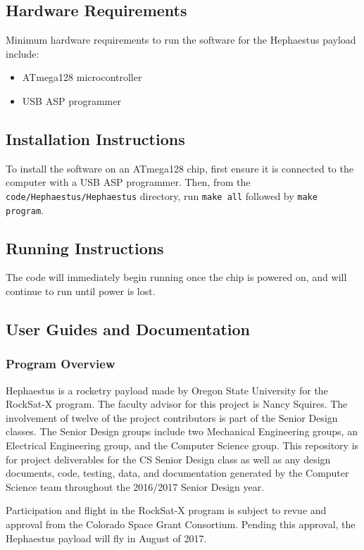 \subsection{Hardware Requirements}
Minimum hardware requirements to run the software for the Hephaestus payload include:
\begin{itemize}
	\item{ATmega128 microcontroller}
	\item{USB ASP programmer}
\end{itemize}

\subsection{Installation Instructions}
To install the software on an ATmega128 chip, first ensure it is connected to
the computer with a USB ASP programmer. Then, from the 
\texttt{code/Hephaestus/Hephaestus} directory, run \texttt{make all}
followed by \texttt{make program}.

\subsection{Running Instructions}
The code will immediately begin running once the chip is powered on, and will
continue to run until power is lost.

\subsection{User Guides and Documentation}
\subsubsection{Program Overview}
Hephaestus is a rocketry payload made by Oregon State University for the RockSat-X program. The faculty advisor for this project is Nancy Squires. The involvement of twelve of the project contributors is part of the Senior Design classes. The Senior Design groups include two Mechanical Engineering groups, an Electrical Engineering group, and the Computer Science group. This repository is for project deliverables for the CS Senior Design class as well as any design documents, code, testing, data, and documentation generated by the Computer Science team throughout the 2016/2017 Senior Design year.

Participation and flight in the RockSat-X program is subject to revue and approval from the Colorado Space Grant Consortium. Pending this approval, the Hephaestus payload will fly in August of 2017.


